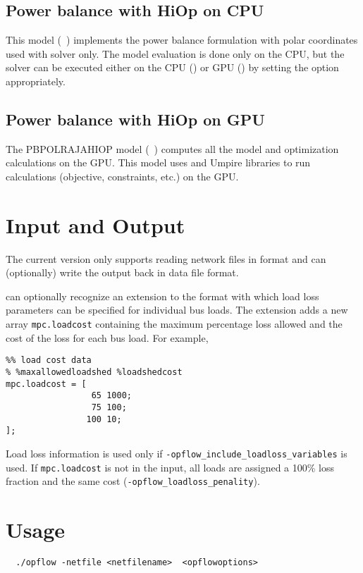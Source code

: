 \subsection{Power balance with HiOp on CPU}
This model ({\opflowmodel~\pbpolhiop}) implements the power balance formulation with polar coordinates used with \hiop solver only. The model evaluation is done only on the CPU, but the \hiop solver can be executed either on the CPU () or GPU () by setting the  option appropriately.

\subsection{Power balance with HiOp on GPU}
The PBPOLRAJAHIOP model ({\opflowmodel~\pbpolrajahiop}) computes all the model and optimization calculations on the GPU. This model uses \raja and Umpire \cite{beckingsale2019umpire} libraries to run \opflow calculations (objective, constraints, etc.) on the GPU. 

\section{Input and Output}
The current \exago version only supports reading network files in \matpower format and can (optionally) write the output back in \matpower data file format.

\exago can optionally recognize an extension to the \matpower format with which load loss parameters can be specified for individual bus loads.  The extension adds a new array \texttt{mpc.loadcost} containing the maximum percentage loss allowed and the cost of the loss for each bus load. For example,
\begin{lstlisting}
%% load cost data
% %maxallowedloadshed %loadshedcost
mpc.loadcost = [
                 65 1000;
                 75 100;
                100 10;
];
\end{lstlisting}
Load loss information is used only if \texttt{-opflow\_include\_loadloss\_variables} is used.  If \texttt{mpc.loadcost} is not in the input, all loads are assigned a 100\% loss fraction and the same cost (\texttt{-opflow\_loadloss\_penality}).


\section{Usage}
\begin{lstlisting}
  ./opflow -netfile <netfilename>  <opflowoptions>
\end{lstlisting}

